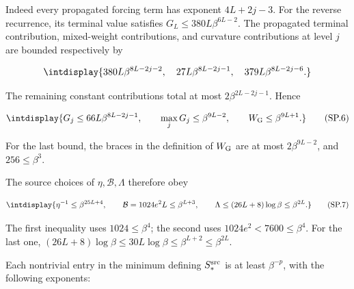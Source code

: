 
Indeed every propagated forcing term has exponent \(4L+2j-3\). For the reverse recurrence, its terminal value satisfies \(G_L\le380L\beta^{6L-2}\). The propagated terminal contribution, mixed-weight contributions, and curvature contributions at level \(j\) are bounded respectively by


\begingroup\renewcommand{\theHequation}{intdisplay.427}
\begin{equation*}
\intdisplay{
380L\beta^{8L-2j-2},\quad
27L\beta^{8L-2j-1},\quad
379L\beta^{8L-2j-6}.
}
\end{equation*}
\endgroup


The remaining constant contributions total at most \(2\beta^{2L-2j-1}\). Hence


\begingroup\renewcommand{\theHequation}{intdisplay.428}
\begin{equation}
\intdisplay{
G_j\le66L\beta^{8L-2j-1},\qquad
\max_jG_j\le\beta^{9L-2},\qquad W_{\rm G}\le\beta^{9L+1}.
}
\tag{SP.6}
\label{int:eq-0210-sp-6}
\end{equation}
\endgroup


For the last bound, the braces in the definition of \(W_{\rm G}\) are at most \(2\beta^{9L-2}\), and \(256\le\beta^3\).



The source choices of \(\eta,\allowbreak \mathcal B,\allowbreak \Lambda\) therefore obey


\begingroup\renewcommand{\theHequation}{intdisplay.429}
\begin{equation}
\intdisplay{
\eta^{-1}\le\beta^{25L+4},\qquad
\mathcal B=1024e^2L\le\beta^{L+3},\qquad
\Lambda\le(26L+8)\log\beta\le\beta^{2L}.
}
\tag{SP.7}
\label{int:eq-0211-sp-7}
\end{equation}
\endgroup


The first inequality uses \(1024\le\beta^4\); the second uses \(1024e^2<7600\le\beta^4\). For the last one, \((26L+8)\log\beta\le30L\log\beta\le\beta^{L+2}\le\beta^{2L}\).



Each nontrivial entry in the minimum defining \(S_*^{\rm src}\) is at least \(\beta^{-p}\), with the following exponents:



